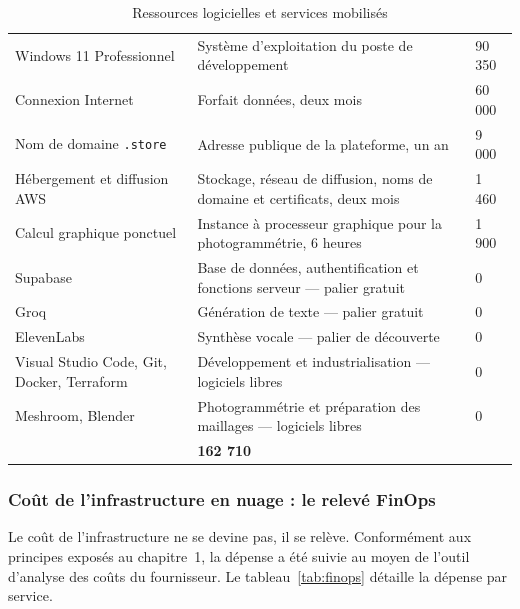 \begin{table}[htbp]
\centering
\caption{Ressources logicielles et services mobilisés}
\label{tab:logiciel}
\small
\begin{tabularx}{\textwidth}{|L{4.4cm}|X|R{2.4cm}|}
\hline
{}
 &  &  \\ \hline
Windows 11 Professionnel & Système d'exploitation du poste de développement & 90 350 \\ \hline
Connexion Internet & Forfait données, deux mois & 60 000 \\ \hline
Nom de domaine \texttt{.store} & Adresse publique de la plateforme, un an & 9 000 \\ \hline
Hébergement et diffusion AWS & Stockage, réseau de diffusion, noms de domaine et certificats, deux mois & 1 460 \\ \hline
Calcul graphique ponctuel & Instance à processeur graphique pour la photogrammétrie, 6 heures & 1 900 \\ \hline
Supabase & Base de données, authentification et fonctions serveur — palier gratuit & 0 \\ \hline
Groq & Génération de texte — palier gratuit & 0 \\ \hline
ElevenLabs & Synthèse vocale — palier de découverte & 0 \\ \hline
Visual Studio Code, Git, Docker, Terraform & Développement et industrialisation — logiciels libres & 0 \\ \hline
Meshroom, Blender & Photogrammétrie et préparation des maillages — logiciels libres & 0 \\ \hline
{}
 & \textbf{162 710} \\ \hline
\end{tabularx}
\end{table}

\subsubsection{Coût de l'infrastructure en nuage : le relevé FinOps}

Le coût de l'infrastructure ne se devine pas, il se relève. Conformément aux
principes exposés au chapitre~1, la dépense a été suivie au moyen de l'outil
d'analyse des coûts du fournisseur. Le tableau~\ref{tab:finops} détaille la
dépense par service.


